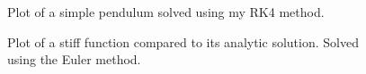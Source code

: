 \documentclass[twocolumn,11pt]{article}
\begin{document}
\begin{figure}[!h]
	\centering
	\noindent
      \caption{Plot of a simple pendulum solved using my RK4 method.}
\end{figure}

\begin{figure}[!h]
	\centering
	\noindent
      \caption{Plot of a stiff function compared to its analytic solution. Solved using the Euler method.}
\end{figure}
\end{document}

